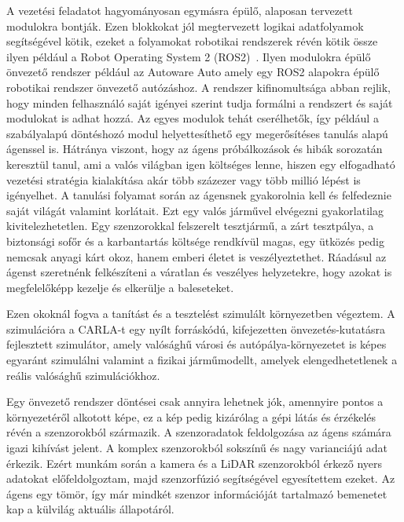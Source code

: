\documentclass[a4paper,12pt,oneside]{article}
\begin{document}
A vezetési feladatot hagyományosan egymásra épülő, alaposan tervezett modulokra bontják. Ezen blokkokat jól megtervezett logikai 
adatfolyamok segítségével kötik, ezeket a folyamokat robotikai rendszerek révén kötik össze ilyen például a Robot Operating System 2 (ROS2)~\cite{macenski2022ros2}.
Ilyen modulokra épülő önvezető rendszer például az Autoware Auto\cite{kato2018autoware} 
amely egy ROS2 alapokra épülő robotikai rendszer önvezető autózáshoz.
A rendszer kifinomultsága abban rejlik, hogy minden felhasználó saját igényei szerint tudja 
formálni a rendszert és saját modulokat is adhat hozzá.
Az egyes modulok tehát cserélhetők, így például a szabályalapú döntéshozó modul helyettesíthető 
egy megerősítéses tanulás alapú ágenssel is. Hátránya viszont, hogy az ágens
próbálkozások és hibák sorozatán keresztül tanul, ami a valós világban igen költséges lenne,
hiszen egy elfogadható vezetési stratégia kialakítása akár több százezer vagy több millió
lépést is igényelhet. A tanulási folyamat során az ágensnek gyakorolnia kell és felfedeznie saját világát valamint korlátait. 
Ezt egy valós járművel elvégezni gyakorlatilag kivitelezhetetlen. Egy szenzorokkal felszerelt tesztjármű, a zárt tesztpálya, a
biztonsági sofőr és a karbantartás költsége rendkívül magas, egy ütközés pedig
nemcsak anyagi kárt okoz, hanem emberi életet is veszélyeztethet. Ráadásul az ágenst szeretnénk felkészíteni
a váratlan és veszélyes helyzetekre, hogy azokat is megfelelőképp kezelje és elkerülje a baleseteket. 

Ezen okoknál fogva a tanítást és a tesztelést szimulált környezetben végeztem. 
A szimulációra a CARLA-t\cite{carla} egy nyílt forráskódú, kifejezetten 
önvezetés-kutatásra fejlesztett szimulátor, amely valósághű városi és autópálya-környezetet is képes egyaránt szimulálni valamint a fizikai járműmodellt,
amelyek elengedhetetlenek a reális valósághű szimulációkhoz.

Egy önvezető rendszer döntései csak annyira lehetnek jók, amennyire pontos a
környezetéről alkotott képe, ez a kép pedig kizárólag a gépi látás és érzékelés révén a szenzorokból származik.
A szenzoradatok feldolgozása az ágens számára igazi kihívást jelent. A komplex szenzorokból sokszínű és nagy varianciájú adat érkezik.
Ezért munkám során a kamera és a LiDAR szenzorokból érkező nyers adatokat előfeldolgoztam, 
majd szenzorfúzió segítségével 
egyesítettem ezeket. 
Az ágens egy tömör, így már mindkét szenzor információját tartalmazó bemenetet kap a külvilág aktuális
állapotáról.
\end{document}
